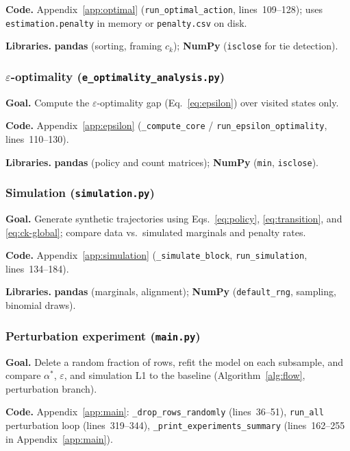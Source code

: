\documentclass[11pt,a4paper]{article}
\begin{document}
\textbf{Code.}\;
Appendix~\ref{app:optimal} (\texttt{run\_optimal\_action}, lines~109--128); uses
\texttt{estimation.penalty} in memory or \texttt{penalty.csv} on disk.

\textbf{Libraries.}\; \textbf{pandas} (sorting, framing $c_k$); \textbf{NumPy}
(\texttt{isclose} for tie detection).

\subsubsection{$\varepsilon$-optimality (\texttt{e\_optimality\_analysis.py})}\label{sec:impl-epsilon}

\textbf{Goal.}\; Compute the $\varepsilon$-optimality gap (Eq.~\eqref{eq:epsilon})
over visited states only.

\textbf{Code.}\; Appendix~\ref{app:epsilon}
(\texttt{\_compute\_core} / \texttt{run\_epsilon\_optimality}, lines~110--130).

\textbf{Libraries.}\; \textbf{pandas} (policy and count matrices); \textbf{NumPy}
(\texttt{min}, \texttt{isclose}).

\subsubsection{Simulation (\texttt{simulation.py})}\label{sec:impl-simulation}

\textbf{Goal.}\; Generate synthetic trajectories using
Eqs.~\eqref{eq:policy}, \eqref{eq:transition}, and \eqref{eq:ck-global}; compare
data vs.\ simulated marginals and penalty rates.

\textbf{Code.}\; Appendix~\ref{app:simulation}
(\texttt{\_simulate\_block}, \texttt{run\_simulation}, lines~134--184).

\textbf{Libraries.}\; \textbf{pandas} (marginals, alignment); \textbf{NumPy}
(\texttt{default\_rng}, sampling, binomial draws).

\subsubsection{Perturbation experiment (\texttt{main.py})}\label{sec:impl-perturbation}

\textbf{Goal.}\; Delete a random fraction of rows, refit the model on each subsample,
and compare $\alpha^\ast$, $\varepsilon$, and simulation L1 to the baseline
(Algorithm~\ref{alg:flow}, perturbation branch).

\textbf{Code.}\; Appendix~\ref{app:main}:
\texttt{\_drop\_rows\_randomly} (lines~36--51),
\texttt{run\_all} perturbation loop (lines~319--344),
\texttt{\_print\_experiments\_summary} (lines~162--255 in Appendix~\ref{app:main}).
\end{document}
